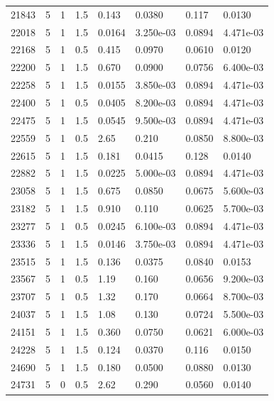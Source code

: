 \documentclass[preview]{standalone}
\begin{document}
{{{{{\begin{tabular}{L{1.2cm}C{1.2cm} C{0.3cm}C{0.5cm} C{1.4cm}C{1.4cm} C{1.4cm}C{1.4cm}}
  21843  &     5  & 1     & 1.5 &  0.143  & 0.0380  & 0.117 &  0.0130   \\ 
  22018  &     5  & 1     & 1.5 &  0.0164  & 3.250e-03  & 0.0894 &  4.471e-03   \\ 
  22168  &     5  & 1     & 0.5 &  0.415  & 0.0970  & 0.0610 &  0.0120   \\ 
  22200  &     5  & 1     & 1.5 &  0.670  & 0.0900  & 0.0756 &  6.400e-03   \\ 
  22258  &     5  & 1     & 1.5 &  0.0155  & 3.850e-03  & 0.0894 &  4.471e-03   \\ 
  22400  &     5  & 1     & 0.5 &  0.0405  & 8.200e-03  & 0.0894 &  4.471e-03   \\ 
  22475  &     5  & 1     & 1.5 &  0.0545  & 9.500e-03  & 0.0894 &  4.471e-03   \\ 
  22559  &     5  & 1     & 0.5 &  2.65  & 0.210  & 0.0850 &  8.800e-03   \\ 
  22615  &     5  & 1     & 1.5 &  0.181  & 0.0415  & 0.128 &  0.0140   \\ 
  22882  &     5  & 1     & 1.5 &  0.0225  & 5.000e-03  & 0.0894 &  4.471e-03   \\ 
  23058  &     5  & 1     & 1.5 &  0.675  & 0.0850  & 0.0675 &  5.600e-03   \\ 
  23182  &     5  & 1     & 1.5 &  0.910  & 0.110  & 0.0625 &  5.700e-03   \\ 
  23277  &     5  & 1     & 0.5 &  0.0245  & 6.100e-03  & 0.0894 &  4.471e-03   \\ 
  23336  &     5  & 1     & 1.5 &  0.0146  & 3.750e-03  & 0.0894 &  4.471e-03   \\ 
  23515  &     5  & 1     & 1.5 &  0.136  & 0.0375  & 0.0840 &  0.0153   \\ 
  23567  &     5  & 1     & 0.5 &  1.19  & 0.160  & 0.0656 &  9.200e-03   \\ 
  23707  &     5  & 1     & 0.5 &  1.32  & 0.170  & 0.0664 &  8.700e-03   \\ 
  24037  &     5  & 1     & 1.5 &  1.08  & 0.130  & 0.0724 &  5.500e-03   \\ 
  24151  &     5  & 1     & 1.5 &  0.360  & 0.0750  & 0.0621 &  6.000e-03   \\ 
  24228  &     5  & 1     & 1.5 &  0.124  & 0.0370  & 0.116 &  0.0150   \\ 
  24690  &     5  & 1     & 1.5 &  0.180  & 0.0500  & 0.0880 &  0.0130   \\ 
  24731  &     5  & 0     & 0.5 &  2.62  & 0.290  & 0.0560 &  0.0140   \\ 

\end{tabular}}}}}}
\end{document}
